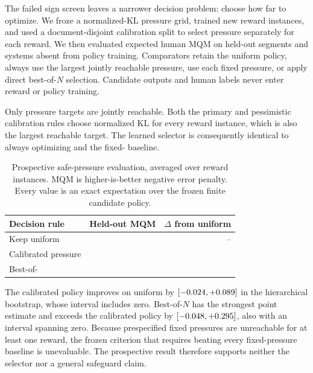 \documentclass[11pt]{article}
\begin{document}
The failed sign screen leaves a narrower decision problem: choose how far to
optimize.  We froze a normalized-KL pressure grid, trained
\SafeRewardInstances{} new reward instances, and used a document-disjoint
calibration split to select pressure separately for each reward.  We then
evaluated expected human MQM on \SafeEvalSegments{} held-out segments and
\SafeHeldoutSystems{} systems absent from policy training.  Comparators retain
the uniform policy, always use the largest jointly reachable pressure, use each
fixed pressure, or apply direct best-of-$N$ selection.  Candidate outputs and
human labels never enter reward or policy training.

Only \SafeReachableTargets{} pressure targets are jointly reachable.  Both the
primary and pessimistic calibration rules choose normalized KL
\SafeSelectedPressure{} for every reward instance, which is also the largest
reachable target.  The learned selector is consequently identical to always
optimizing and the fixed-\SafeSelectedPressure{} baseline.

\begin{table}[t]
\centering
\small
\setlength{\tabcolsep}{5pt}
\begin{tabular}{lrr}
\toprule
Decision rule & Held-out MQM & $\Delta$ from uniform \\
\midrule
Keep uniform & \SafeKeepQuality{} & -- \\
Calibrated pressure & \SafeSelectorQuality{} & \SafeSelectorChange{} \\
Best-of-\SafeBestN{} & \SafeBestNQuality{} & \SafeBestNChange{} \\
\bottomrule
\end{tabular}
\caption{Prospective safe-pressure evaluation, averaged over reward instances.
MQM is higher-is-better negative error penalty.  Every value is an exact
expectation over the frozen finite candidate policy.}
\label{tab:safepressure}
\end{table}

The calibrated policy improves on uniform by \SafeSelectorMinusKeep{}
$[-0.024{},+0.089{}]$ in the hierarchical
bootstrap, whose interval includes zero.  Best-of-$N$ has the strongest point
estimate and exceeds the calibrated policy by \SafeBestNMinusSelector{}
$[-0.048{},+0.295{}]$, also with an
interval spanning zero.  Because \SafeMissingTargets{} prespecified fixed
pressures are unreachable for at least one reward, the frozen criterion that
requires beating every fixed-pressure baseline is unevaluable.  The prospective
result therefore supports neither the selector nor a general safeguard claim.
\end{document}
